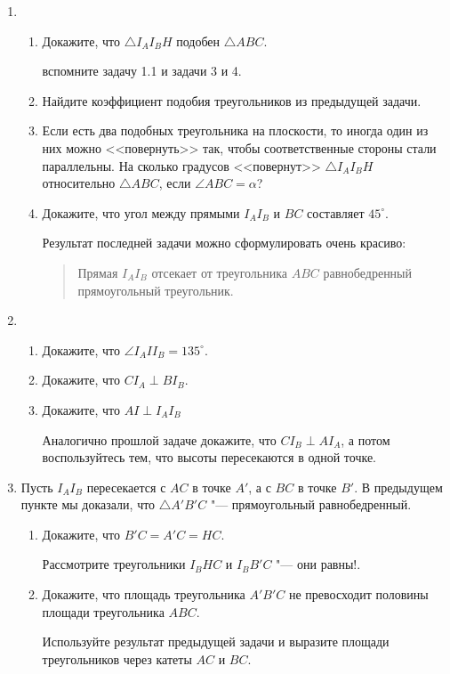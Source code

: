 \documentclass[12pt]{article}
\begin{document}
\begin{enumerate}[\bf 1.]
\begin{enumerate}[1.]
\end{enumerate}


\item

\begin{enumerate}[1.]
    \item  Докажите, что $\triangle I_A I_B H$ подобен $\triangle ABC$.
    \begin{leftbar}
    вспомните задачу 1.1 и задачи 3 и 4.
    \end{leftbar}
    
    \item Найдите коэффициент подобия треугольников из предыдущей задачи.
    \item Если есть два подобных треугольника на плоскости, то иногда один из них можно <<повернуть>> так, чтобы соответственные стороны стали параллельны. На сколько градусов <<повернут>> $\triangle I_A I_B H$ относительно $\triangle ABC$, если $\angle ABC = \alpha$?
    \item Докажите, что угол между прямыми $I_AI_B$ и $BC$ составляет $45^\circ$.

            \medskip

    Результат последней задачи можно сформулировать очень красиво:
    \begin{quote}
        Прямая $I_AI_B$ отсекает от треугольника $ABC$ равнобедренный прямоугольный треугольник.
    \end{quote}
\end{enumerate}

\item
\begin{enumerate}
    \item
    Докажите, что $\angle I_A I I_B = 135^\circ$.
    \item
    Докажите, что $CI_A \perp BI_B$.
    \item
    Докажите, что $AI \perp I_AI_B$
    \begin{leftbar}
    Аналогично прошлой задаче докажите, что $CI_B \perp AI_A$, а потом воспользуйтесь тем, что высоты пересекаются в одной точке. 
    \end{leftbar}
\end{enumerate}

\item
Пусть $I_AI_B$ пересекается с $AC$ в точке $A'$, а с $BC$  в точке $B'$. В предыдущем пункте мы доказали, что $\triangle A'B'C$ "--- прямоугольный равнобедренный.
\begin{enumerate}
    \item 
    Докажите, что $B'C = A'C = HC$.
    \begin{leftbar}
    Рассмотрите треугольники $I_B H C$ и $I_B B' C$ "--- они равны!. 
    \end{leftbar}
    \item 
    Докажите, что площадь треугольника $A'B'C$ не превосходит половины площади треугольника $ABC$.
    \begin{leftbar}
    Используйте результат предыдущей задачи и выразите площади треугольников через катеты $AC$ и $BC$.
    \end{leftbar}
\end{enumerate}
\end{enumerate}
\end{document}
